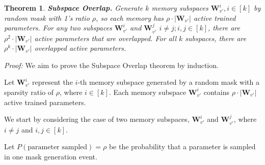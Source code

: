 \documentclass{article}
\newtheorem{theorem}{Theorem}[section]
\begin{document}




\begin{theorem}\label{app_theorem:subspace_overlap}
    \textbf{Subspace Overlap.} 
    Generate $k$ memory subspaces $\mathbf{W}_{v'}^{i}, i \in [k]$ by random mask with 1's ratio $\rho$, so each memory has $\rho\cdot|\mathbf{W}_{v'}|$ active trained parameters. For any two subspaces $\mathbf{W}_{v'}^{i}$ and $\mathbf{W}_{v'}^{j}$ $i\neq j ;i,j \in [k]$, there are $\rho^2\cdot|\mathbf{W}_{v'}|$ active parameters that are overlapped. For all $k$ subspaces, there are $\rho^k\cdot|\mathbf{W}_{v'}|$ overlapped active parameters.
\end{theorem}

\textit{Proof:} We aim to prove the Subspace Overlap theorem by induction.

Let $\mathbf{W}_{v'}^{i}$ represent the $i$-th memory subspace generated by a random mask with a sparsity ratio of $\rho$, where $i \in [k]$. Each memory subspace $\mathbf{W}_{v'}^{i}$ contains $\rho\cdot|\mathbf{W}_{v'}|$ active trained parameters.

We start by considering the case of two memory subspaces, $\mathbf{W}_{v'}^{i}$ and $\mathbf{W}_{v'}^{j}$, where $i \neq j$ and $i, j \in [k]$.

Let $P(\text{parameter sampled}) = \rho$ be the probability that a parameter is sampled in one mask generation event.
\end{document}

